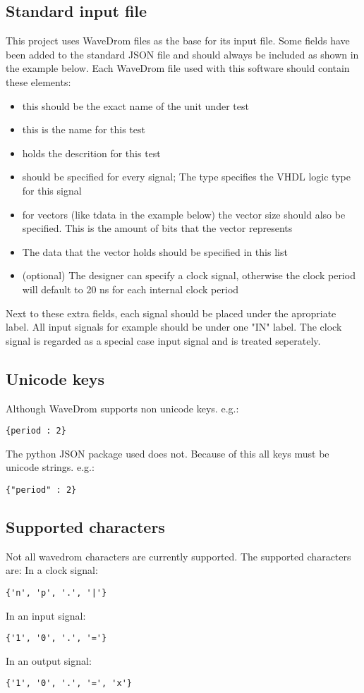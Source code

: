 \subsection{Standard input file}
This project uses WaveDrom files as the base for its input file. Some fields have been added to the standard JSON file and should always be included as shown in the example below. Each WaveDrom file used with this software should contain these elements:
\begin{itemize}
	\item [name(*):] this should be the exact name of the unit under test
	\item [test:] this is the name for this test
	\item [description:] holds the descrition for this test
	\item [type:] should be specified for every signal; The type specifies the VHDL logic type for this signal
	\item [vector\_size:] for vectors (like tdata in the example below) the vector size should also be specified. This is the amount of bits that the vector represents
	\item [data:] The data that the vector holds should be specified in this list
	\item [clock\_period:] (optional) The designer can specify a clock signal, otherwise the clock period will default to 20 ns for each internal clock period
\end{itemize}
Next to these extra fields, each signal should be placed under the apropriate label. All input signals for example should be under one "IN" label. The clock signal is regarded as a special case input signal and is treated seperately.\newpage
\subsection{Unicode keys}
Although WaveDrom supports non unicode keys. e.g.:
\begin{lstlisting}[style=json]
{period : 2}
\end{lstlisting}
The python JSON package used does not. Because of this all keys must be unicode strings. e.g.:
\begin{lstlisting}[style=json]
{"period" : 2}
\end{lstlisting}
\subsection{Supported characters}
Not all wavedrom characters are currently supported. The supported characters are:
\npar
In a clock signal: 
\begin{lstlisting}[style=json]
{'n', 'p', '.', '|'}
\end{lstlisting}
In an input signal: 
\begin{lstlisting}[style=json]
{'1', '0', '.', '='}
\end{lstlisting}
In an output signal: 
\begin{lstlisting}[style=json]
{'1', '0', '.', '=', 'x'}
\end{lstlisting}\newpage
